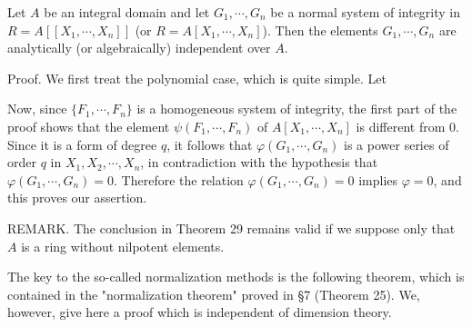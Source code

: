 Let $A$ be an integral domain and let $G_1, \cdots, G_n$ be a normal system of integrity in $R = A[[X_1, \cdots, X_n]]$ (or $R = A[X_1, \cdots, X_n]$). Then the elements $G_1, \cdots, G_n$ are analytically (or algebraically) independent over $A$.

Proof. We first treat the polynomial case, which is quite simple. Let

Now, since $\{F_1, \cdots, F_n\}$ is a homogeneous system of integrity, the first part of the proof shows that the element $\psi(F_1, \cdots, F_n)$ of $A[X_1, \cdots, X_n]$ is different from 0. Since it is a form of degree $q$, it follows that $\varphi(G_1, \cdots, G_n)$ is a power series of order $q$ in $X_1, X_2, \cdots, X_n$, in contradiction with the hypothesis that $\varphi(G_1, \cdots, G_n) = 0$. Therefore the relation $\varphi(G_1, \cdots, G_n) = 0$ implies $\varphi = 0$, and this proves our assertion.

REMARK. The conclusion in Theorem 29 remains valid if we suppose only that $A$ is a ring without nilpotent elements.

The key to the so-called normalization methods is the following theorem, which is contained in the "normalization theorem" proved in §7 (Theorem 25). We, however, give here a proof which is independent of dimension theory.
